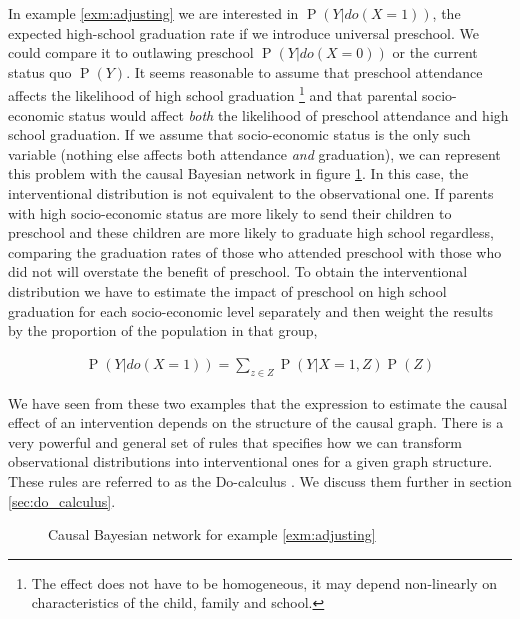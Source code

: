 \documentclass[11pt,a4paper,twoside]{report}
\newcommand{\eqn}[1]{\begin{align}#1\end{align}}
\renewcommand{\P}[1]{\operatorname{P}\left(#1\right)}
\theoremstyle{plain}
\theoremstyle{definition}
\begin{document}
In example \ref{exm:adjusting} we are interested in $\P{Y|do(X=1)}$, the expected high-school graduation rate if we introduce universal preschool. We could compare it to outlawing preschool $\P{Y|do(X=0)}$ or the current status quo $\P{Y}$. It seems reasonable to assume that preschool attendance affects the likelihood of high school graduation \footnote{The effect does not have to be homogeneous, it may depend non-linearly on characteristics of the child, family and school.} and that parental socio-economic status would affect \emph{both} the likelihood of preschool attendance and high school graduation. If we assume that socio-economic status is the only such variable (nothing else affects both attendance \emph{and} graduation), we can represent this problem with the causal Bayesian network in figure \ref{fig:causal_adjust}. In this case, the interventional distribution is not equivalent to the observational one. If parents with high socio-economic status are more likely to send their children to preschool and these children are more likely to graduate high school regardless, comparing the graduation rates of those who attended preschool with those who did not will overstate the benefit of preschool. To obtain the interventional distribution we have to estimate the impact of preschool on high school graduation for each socio-economic level separately and then weight the results by the proportion of the population in that group,

\eqn{
\label{eqn:backdoor_example}
\P{Y|do(X=1)} = \sum_{z \in Z}\P{Y|X=1,Z}\P{Z}
} 

We have seen from these two examples that the expression to estimate the causal effect of an intervention depends on the structure of the causal graph. There is a very powerful and general set of rules that specifies how we can transform observational distributions into interventional ones for a given graph structure. These rules are referred to as the Do-calculus \citep{Pearl2000}. We discuss them further in section \ref{sec:do_calculus}. 


\begin{figure}
\center
{}
\caption{Causal Bayesian network for example \ref{exm:adjusting}}
\label{fig:causal_adjust} 
\end{figure}
\end{document}
